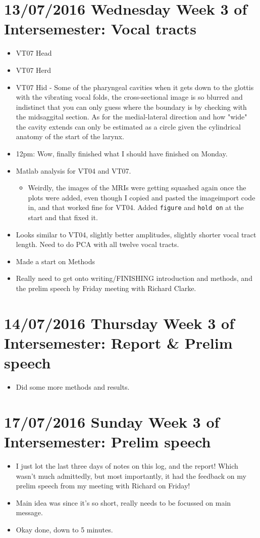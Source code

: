 \documentclass{article}
\begin{document}
\section*{13/07/2016 Wednesday Week 3 of Intersemester: Vocal tracts}
\begin{itemize}
    \item VT07 Head
    \item VT07 Herd
    \item VT07 Hid - Some of the pharyngeal cavities when it gets down to the glottis with the vibrating vocal folds, the cross-sectional image is so blurred and indistinct that you can only guess where the boundary is by checking with the midsaggital section. As for the medial-lateral direction and how "wide" the cavity extends can only be estimated as a circle given the cylindrical anatomy of the start of the larynx. 
    \item 12pm: Wow, finally finished what I should have finished on Monday.
    \item Matlab analysis for VT04 and VT07.
    \begin{itemize}
        \item Weirdly, the images of the MRIs were getting squashed again once the plots were added, even though I copied and pasted the imageimport code in, and that worked fine for VT04. Added \verb|figure| and \verb|hold on| at the start and that fixed it.
    \end{itemize}
    \item Looks similar to VT04, slightly better amplitudes, slightly shorter vocal tract length. Need to do PCA with all twelve vocal tracts.
    \item Made a start on Methods
    \item Really need to get onto writing/FINISHING introduction and methods, and the prelim speech by Friday meeting with Richard Clarke.
\end{itemize}

\section*{14/07/2016 Thursday Week 3 of Intersemester: Report \& Prelim speech}
\begin{itemize}
    \item Did some more methods and results.
\end{itemize}

\section*{17/07/2016 Sunday Week 3 of Intersemester: Prelim speech}
\begin{itemize}
    \item I just lot the last three days of notes on this log, and the report! Which wasn't much admittedly, but most importantly, it had the feedback on my prelim speech from my meeting with Richard on Friday!
    \item Main idea was since it's so short, really needs to be focussed on main message.
    \item Okay done, down to 5 minutes.
\end{itemize}
\end{document}
